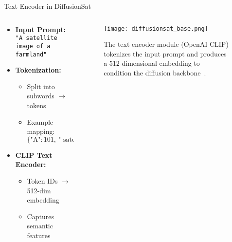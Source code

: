 \begin{refsection}
  \begin{frame}{Text Encoder in DiffusionSat}
    \begin{columns}[t]
      \begin{column}{0.4\textwidth}
        \small
        \begin{itemize}
          \item \textbf{Input Prompt:} \texttt{"A satellite image of a farmland"}
          \item \textbf{Tokenization:}
          \begin{itemize}
            \item Split into subwords $\rightarrow$ tokens
            \item Example mapping: \(\{\text{"A"}:101,\ \text{" satellite"}:564,\ \dots,\ \texttt{<EOS>}:102\}\)
          \end{itemize}
          \item \textbf{CLIP Text Encoder:}
          \begin{itemize}
            \item Token IDs $\rightarrow$ 512-dim embedding
            \item Captures semantic features
          \end{itemize}
        \end{itemize}
      \end{column}
      \begin{column}{0.6\textwidth}
        \begin{figure}
          \centering
          \texttt{[image: diffusionsat\_base.png]}
          \caption{\scriptsize The text encoder module (OpenAI CLIP) tokenizes the input prompt and produces a 512-dimensional embedding to condition the diffusion backbone~\parencite{diffusionset2024}.}
        \end{figure}
      \end{column}
    \end{columns}
    \bottomleftrefs
  \end{frame}
\end{refsection}

